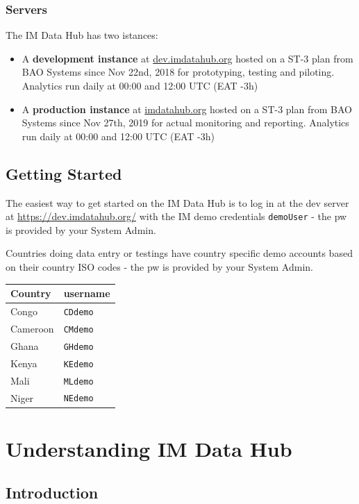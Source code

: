 \documentclass[]{book}
\providecommand{\tightlist}{%
  \setlength{\itemsep}{0pt}\setlength{\parskip}{0pt}}
\begin{document}
\hypertarget{servers}{%
\subsection{Servers}\label{servers}}

The IM Data Hub has two istances:

\begin{itemize}
\tightlist
\item
  A \textbf{development instance} at \href{https://dev.imdatahub.org}{dev.imdatahub.org} hosted on a ST-3 plan from BAO Systems since Nov 22nd, 2018 for prototyping, testing and piloting. Analytics run daily at 00:00 and 12:00 UTC (EAT -3h)
\item
  A \textbf{production instance} at \href{https://imdatahub.org}{imdatahub.org} hosted on a ST-3 plan from BAO Systems since Nov 27th, 2019 for actual monitoring and reporting. Analytics run daily at 00:00 and 12:00 UTC (EAT -3h)
\end{itemize}

\hypertarget{getting-started}{%
\section{Getting Started}\label{getting-started}}

The easiest way to get started on the IM Data Hub is to log in at the dev server at \url{https://dev.imdatahub.org/} with the IM demo credentials \texttt{demoUser} - the pw is provided by your System Admin.

Countries doing data entry or testings have country specific demo accounts based on their country ISO codes - the pw is provided by your System Admin.

\begin{longtable}[]{@{}ll@{}}
\toprule
Country & username\tabularnewline
\midrule
\endhead
Congo & \texttt{CDdemo}\tabularnewline
Cameroon & \texttt{CMdemo}\tabularnewline
Ghana & \texttt{GHdemo}\tabularnewline
Kenya & \texttt{KEdemo}\tabularnewline
Mali & \texttt{MLdemo}\tabularnewline
Niger & \texttt{NEdemo}\tabularnewline
\bottomrule
\end{longtable}

\hypertarget{comp}{%
\chapter{Understanding IM Data Hub}\label{comp}}

\hypertarget{introduction}{%
\section{Introduction}\label{introduction}}
\end{document}
